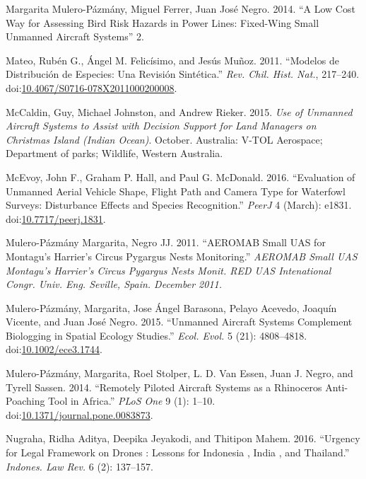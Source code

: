 \documentclass[]{interact}
\theoremstyle{plain}%
\theoremstyle{definition}
\theoremstyle{remark}
\begin{document}
\hypertarget{ref-margarita_mulero-pazmany_juan_jose_negro_low_2014}{}
Margarita Mulero-Pázmány, Miguel Ferrer, Juan José Negro. 2014. ``A Low
Cost Way for Assessing Bird Risk Hazards in Power Lines: Fixed-Wing
Small Unmanned Aircraft Systems'' 2.

\hypertarget{ref-mateo_modelos_2011}{}
Mateo, Rubén G., Ángel M. Felicísimo, and Jesús Muñoz. 2011. ``Modelos
de Distribución de Especies: Una Revisión Sintética.'' \emph{Rev. Chil.
Hist. Nat.}, 217--240.
doi:\href{https://doi.org/10.4067/S0716-078X2011000200008}{10.4067/S0716-078X2011000200008}.

\hypertarget{ref-mccaldin_use_2015}{}
McCaldin, Guy, Michael Johnston, and Andrew Rieker. 2015. \emph{Use of
Unmanned Aircraft Systems to Assist with Decision Support for Land
Managers on Christmas Island (Indian Ocean)}. October. Australia: V-TOL
Aerospace; Department of parks; Wildlife, Western Australia.

\hypertarget{ref-mcevoy_evaluation_2016}{}
McEvoy, John F., Graham P. Hall, and Paul G. McDonald. 2016.
``Evaluation of Unmanned Aerial Vehicle Shape, Flight Path and Camera
Type for Waterfowl Surveys: Disturbance Effects and Species
Recognition.'' \emph{PeerJ} 4 (March): e1831.
doi:\href{https://doi.org/10.7717/peerj.1831}{10.7717/peerj.1831}.

\hypertarget{ref-mulero-pazmany_margarita_aeromab_2011}{}
Mulero-Pázmány Margarita, Negro JJ. 2011. ``AEROMAB Small UAS for
Montagu's Harrier's Circus Pygargus Nests Monitoring.'' \emph{AEROMAB
Small UAS Montagu's Harrier's Circus Pygargus Nests Monit. RED UAS
Intenational Congr. Univ. Eng. Seville, Spain. December 2011.}

\hypertarget{ref-mulero-pazmany_unmanned_2015}{}
Mulero-Pázmány, Margarita, Jose Ángel Barasona, Pelayo Acevedo, Joaquín
Vicente, and Juan José Negro. 2015. ``Unmanned Aircraft Systems
Complement Biologging in Spatial Ecology Studies.'' \emph{Ecol. Evol.} 5
(21): 4808--4818.
doi:\href{https://doi.org/10.1002/ece3.1744}{10.1002/ece3.1744}.

\hypertarget{ref-mulero-pazmany_remotely_2014}{}
Mulero-Pázmány, Margarita, Roel Stolper, L. D. Van Essen, Juan J. Negro,
and Tyrell Sassen. 2014. ``Remotely Piloted Aircraft Systems as a
Rhinoceros Anti-Poaching Tool in Africa.'' \emph{PLoS One} 9 (1): 1--10.
doi:\href{https://doi.org/10.1371/journal.pone.0083873}{10.1371/journal.pone.0083873}.

\hypertarget{ref-nugraha_urgency_2016}{}
Nugraha, Ridha Aditya, Deepika Jeyakodi, and Thitipon Mahem. 2016.
``Urgency for Legal Framework on Drones : Lessons for Indonesia , India
, and Thailand.'' \emph{Indones. Law Rev.} 6 (2): 137--157.
\end{document}
